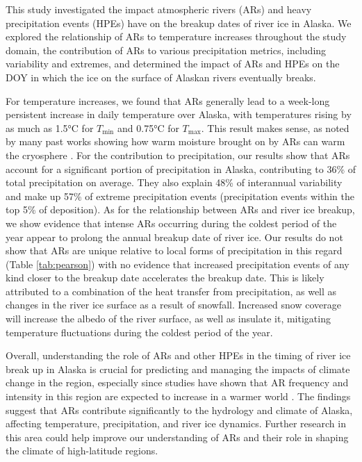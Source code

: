 \documentclass[12pts,draft]{AR_analysis_}
\begin{document}
This study investigated the impact atmospheric rivers (ARs) and heavy precipitation events
(HPEs) have on the breakup dates of 
river ice in Alaska. We explored the relationship of ARs to temperature increases throughout 
the study domain, the contribution of ARs to various precipitation metrics, 
including variability and extremes, and determined the impact of ARs and HPEs on the DOY 
in which the ice on the surface of Alaskan rivers eventually breaks. 

For temperature increases, we found that ARs generally lead to a week-long persistent 
increase in daily temperature over Alaska, with temperatures rising by as much as 1.5°C 
for $T_{\text{min}}$ and 0.75°C for $T_{\text{max}}$. This result makes sense, as noted 
by many past works showing how warm moisture brought on by ARs can warm the cryosphere
\cite{Wille2021, Ma2023, ARs_lead_to_sea_ice_loss, Zhang2023}. For the contribution to 
precipitation, our results show that ARs account for a significant portion of precipitation 
in Alaska, contributing to 36\% of total precipitation on average. They also explain 48\% 
of interannual variability and make up 57\% of extreme precipitation events 
(precipitation events within the top 5\% of deposition). As for 
the relationship between ARs and river ice breakup, we show evidence that intense ARs
occurring during the coldest period of the year appear to prolong the annual breakup 
date of river ice. Our results do not show that ARs are unique relative to local forms of 
precipitation in this regard (Table \ref{tab:pearson}) with no evidence that increased 
precipitation events of any kind closer to the breakup date accelerates the breakup date.
This is likely attributed to a combination of the heat transfer from precipitation, 
as well as changes in the river ice surface as a result of snowfall. Increased snow coverage
will increase the albedo of the river surface, as well as insulate it, mitigating temperature 
fluctuations during the coldest period of the year. 

Overall, understanding the role of ARs and other HPEs in the
timing of river ice break up in Alaska is 
crucial for predicting and managing the impacts of climate change in the region, 
especially since studies have shown that AR frequency and intensity in this region are 
expected to increase in a warmer world \cite{Espinoza2018, Massoud2019}. The findings 
suggest that ARs contribute significantly to the hydrology and climate of Alaska, 
affecting temperature, precipitation, and river ice dynamics. Further research in this 
area could help improve our understanding of ARs and their role in shaping the climate 
of high-latitude regions.
\end{document}
